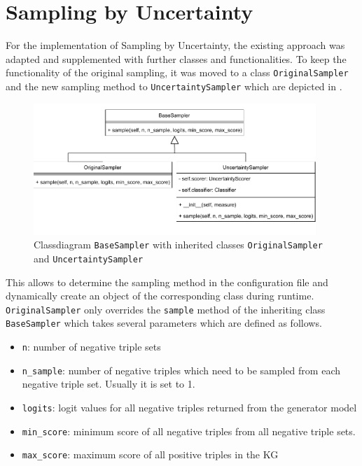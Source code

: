  \section{Sampling by Uncertainty}
 \label{sec:sampling_by_uncertainty}
 
For the implementation of Sampling by Uncertainty, the existing approach was adapted and supplemented with further classes and functionalities.
To keep the functionality of the original sampling, it was moved to a class \texttt{OriginalSampler} and the new sampling method to \texttt{UncertaintySampler} which are depicted in .
\begin{figure}[t]
  \centering
    \includegraphics[width=0.95\textwidth]{figures/classdiagrams/BaseSampler.pdf}
    \caption{Classdiagram \texttt{BaseSampler} with inherited classes \texttt{OriginalSampler} and \texttt{UncertaintySampler}}
  \label{fig:base_sampler}
\end{figure}
This allows to determine the sampling method in the configuration file and dynamically create an object of the corresponding class during runtime.
\texttt{OriginalSampler} only overrides the \texttt{sample} method of 
the inheriting class \texttt{BaseSampler} which takes several parameters which are defined as follows.
\begin{itemize}
    \item 
    \texttt{n}: number of negative triple sets
    
    \item 
    \texttt{n\_sample}: 
    number of negative triples which need to be sampled from each negative triple set.
    Usually it is set to 1.
    
    \item 
    \texttt{logits}:
    logit values for all negative triples returned from the generator model
    
    \item 
    \texttt{min\_score}:
    minimum score of all negative triples from all negative triple sets.
    
    \item 
    \texttt{max\_score}:
    maximum score of all positive triples in the \ac{KG}
\end{itemize}

